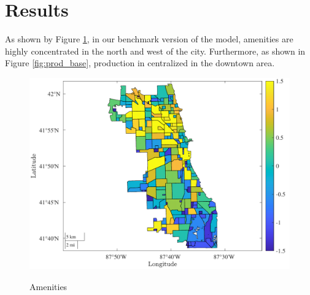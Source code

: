 \documentclass[12pt]{article}
\begin{document}
\section{Results}
As shown by Figure \ref{fig:amenities_base}, in our benchmark version of the model, amenities are highly concentrated in the north and west of the city. Furthermore, as shown in Figure \ref{fig:prod_base}, production in centralized in the downtown area.
\begin{figure}[h]
    \centering
    \caption{Amenities}
    \includegraphics[width=.75\textwidth]{Pset1/Figures/Single Agent/Baseline/eAmenities.pdf}
    \label{fig:amenities_base}
\end{figure}  
\end{document}
